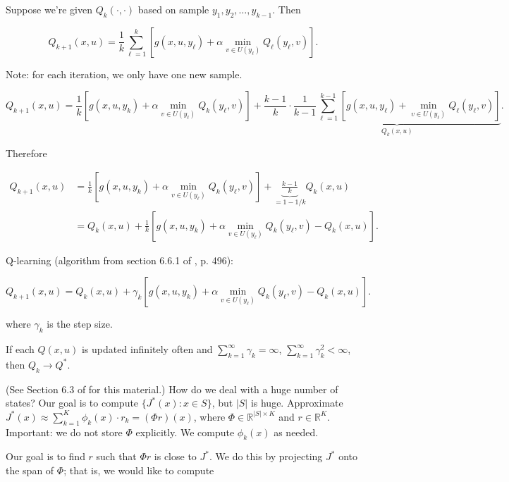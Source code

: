 Suppose we're given \(Q_k(\cdot, \cdot)\) based on sample \(y_1, y_2, \ldots, y_{k-1}\). Then

\[
Q_{k+1}(x,u) = \frac{1}{k} \sum_{\ell=1}^k [g(x, u, y_\ell) + \alpha \min_{v \in U(y_\ell)} Q_\ell(y_\ell, v)].
\]

Note: for each iteration, we only have one new sample.

\[
Q_{k+1}(x,u) = \frac{1}{k}\left[ g(x, u, y_k)  + \alpha \min_{v \in U(y_\ell)} Q_k(y_\ell, v) \right ] + \frac{k-1}{k} \cdot  \underbrace{\frac{1}{k-1}  \sum_{\ell=1}^{k-1} [g(x, u, y_\ell) +  \min_{v \in U(y_\ell)} Q_\ell(y_\ell, v)]}_{Q_k(x, u)}.
\]

Therefore 

\begin{align*}
Q_{k+1}(x,u) & = \frac{1}{k}\left[ g(x, u, y_k)  + \alpha \min_{v \in U(y_\ell)} Q_k(y_\ell, v) \right] + \underbrace{\frac{k-1}{k}}_{= 1 - 1/k} Q_k(x, u)
\\ & = Q_k(x,u) + \frac{1}{k} \left[g(x, u, y_k) + \alpha \min_{v \in U(y_\ell)} Q_k(y_\ell, v) - Q_k(x,u) \right] .
\end{align*}

Q-learning (algorithm from section 6.6.1 of \citet{v2_bertsekas2012dynamic}, p. 496):

\[
Q_{k+1}(x, u) = Q_k(x, u) + \gamma_k  \left[g(x, u, y_k) + \alpha \min_{v \in U(y_\ell)} Q_k(y_\ell, v) - Q_k(x,u) \right] .
\]

where \(\gamma_k\) is the step size.

\begin{theorem}
If each \(Q(x,u)\) is updated infinitely often and \(\sum_{k=1}^\infty \gamma_k = \infty\), \(\sum_{k=1}^\infty \gamma_k^2 < \infty\), then \(Q_k \to Q^*\).

\end{theorem} 

(See Section 6.3 of \citet{v2_bertsekas2012dynamic} for this material.) How do we deal with a huge number of states? Our goal is to compute \(\{J^*(x): x \in S\}\), but \(|S|\) is huge. Approximate \(J^*(x) \approx \sum_{k=1}^K \phi_k(x) \cdot r_k = (\Phi r)(x) \), where \(\Phi \in \mathbb{R}^{|S| \times K}\) and \(r \in \mathbb{R}^K\). Important: we do not store \(\Phi\) explicitly. We compute \(\phi_k(x)\) as needed.

Our goal is to find \(r\) such that \(\Phi r\) is close to \(J^*\). We do this by projecting \(J^*\) onto the span of \(\Phi\); that is, we would like to compute

